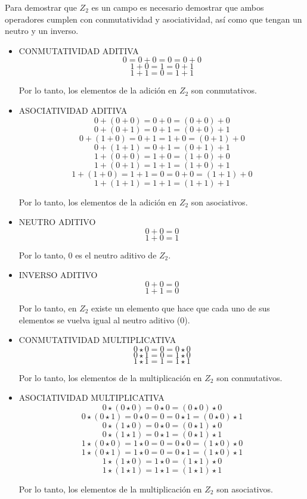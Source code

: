 \documentclass{article}
\begin{document}
Para demostrar que $Z_2$ es un campo es necesario demostrar que ambos operadores cumplen con conmutatividad y asociatividad, así como que tengan un neutro y un inverso.

\begin{itemize}
    \item CONMUTATIVIDAD ADITIVA
$$
0 = 0 + 0 = 0 = 0 + 0
$$$$
1 + 0 = 1 = 0 + 1
$$$$
1 + 1 = 0 = 1 + 1
$$

Por lo tanto, los elementos de la adición en $Z_2$ son conmutativos.

    \item ASOCIATIVIDAD ADITIVA
$$
0+(0+0) = 0+0 = (0+0) + 0
$$$$
0+(0+1) = 0+1 = (0+0) + 1
$$$$
0+(1+0) = 0+1 = 1+0 = (0+1) + 0
$$$$
0+(1+1) = 0+1 = (0+1) + 1
$$$$
1+(0+0) = 1+0 = (1+0) + 0
$$$$
1+(0+1) = 1+1 = (1+0) + 1
$$$$
1+(1+0) = 1+1 = 0 = 0 + 0 = (1+1) + 0
$$$$
1+(1+1) = 1+1 = (1+1) + 1
$$

Por lo tanto, los elementos de la adición en $Z_2$ son asociativos.

    \item NEUTRO ADITIVO
$$
0+0 = 0
$$$$
1+0 = 1
$$

Por lo tanto, $0$ es el neutro aditivo de $Z_2$.

    \item INVERSO ADITIVO
$$
0 + 0 = 0
$$$$
1 + 1 = 0
$$

Por lo tanto, en $Z_2$ existe un elemento que hace que cada uno de sus elementos se vuelva igual al neutro aditivo ($0$).
    \item CONMUTATIVIDAD MULTIPLICATIVA
$$
0 \star 0 = 0 = 0 \star 0
$$$$
0 \star 1 = 0 = 1 \star 0
$$$$
1 \star 1 = 1 = 1 \star 1
$$

Por lo tanto, los elementos de la multiplicación en $Z_2$ son conmutativos.

    \item ASOCIATIVIDAD MULTIPLICATIVA
$$
0 \star (0 \star 0) = 0 \star 0 = (0 \star 0) \star 0
$$$$
0 \star (0 \star 1) = 0 \star 0 = 0 = 0 \star 1 = (0 \star 0) \star 1
$$$$
0 \star (1 \star 0) = 0 \star 0 = (0 \star 1) \star 0
$$$$
0 \star (1 \star 1) = 0 \star 1 = (0 \star 1) \star 1
$$$$
1 \star (0 \star 0) = 1 \star 0 = 0 = 0 \star 0 = (1 \star 0) \star 0
$$$$
1 \star (0 \star 1) = 1 \star 0 = 0 = 0 \star 1 = (1 \star 0) \star 1
$$$$
1 \star (1 \star 0) = 1 \star 0 = (1 \star 1) \star 0
$$$$
1 \star (1 \star 1) = 1 \star 1 = (1 \star 1) \star 1
$$

Por lo tanto, los elementos de la multiplicación en $Z_2$ son asociativos.


\end{itemize}
\end{document}
